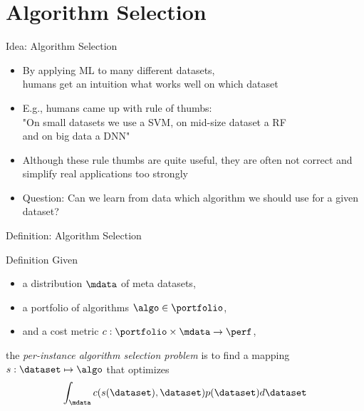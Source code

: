 \section{Algorithm Selection}
\begin{frame}[c]{Idea: Algorithm Selection}

\begin{itemize}
	\item By applying ML to many different datasets,\\
	humans get an intuition \alert{what works well on which dataset}
	\pause
	\item E.g., humans came up with rule of thumbs:\\
	"On small datasets we use a SVM, on mid-size dataset a RF\\ 
	and on big data a DNN"
	\pause
	\item Although these rule thumbs are quite useful,
	they are often not correct and simplify real applications too strongly
	\pause
	\item \alert{Question}: Can we learn from data which algorithm we should use for a given dataset?
\end{itemize}


\end{frame}
\begin{frame}[c]{Definition: Algorithm Selection }

\begin{block}{Definition}
	Given 
	\begin{itemize}
		\item a \alert{distribution} $\mdata$ of meta datasets,
		\item a portfolio of algorithms $\algo \in \portfolio$,
		\item and a cost metric $c:  \portfolio \times \mdata \rightarrow \perf$,   
	\end{itemize}
	
	the \emph{per-instance algorithm selection problem} is to find a mapping 
	$s: \dataset \mapsto \algo$ 
	that optimizes 
	$$\int_{\mdata} c(s(\dataset),\dataset) p(\dataset)  d\dataset$$
\end{block}


\end{frame}
